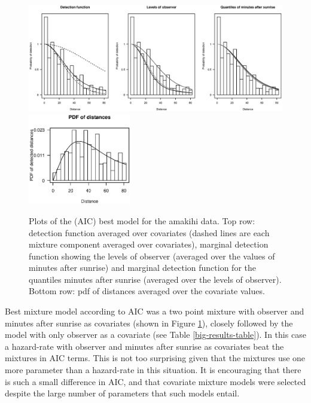 \documentclass[useAMS,referee, usegraphicx]{biom}
\begin{document}
\begin{figure}
\centering
\includegraphics[width=\textwidth]{analyses/amakihi-om.eps}\\
\includegraphics[width=0.4\textwidth]{analyses/amakihi-om-pdf.eps}
\caption{Plots of the (AIC) best model for the amakihi data. Top row: detection function averaged over covariates (dashed lines are each mixture component averaged over covariates), marginal detection function showing the levels of observer (averaged over the values of minutes after sunrise) and marginal detection function for the quantiles minutes after sunrise (averaged over the levels of observer). Bottom row: pdf of distances averaged over the covariate values.}
\label{amakihi}
\end{figure}

Best mixture model according to AIC was a two point mixture with observer and minutes after sunrise as covariates (shown in Figure \ref{amakihi}), closely followed by the model with only observer as a covariate (see Table \ref{big-results-table}). In this case a hazard-rate with observer and minutes after sunrise as covariates beat the mixtures in AIC terms. This is not too surprising given that the mixtures use one more parameter than a hazard-rate in this situation. It is encouraging that there is such a small difference in AIC, and that covariate mixture models were selected despite the large number of parameters that such models entail.
\end{document}

